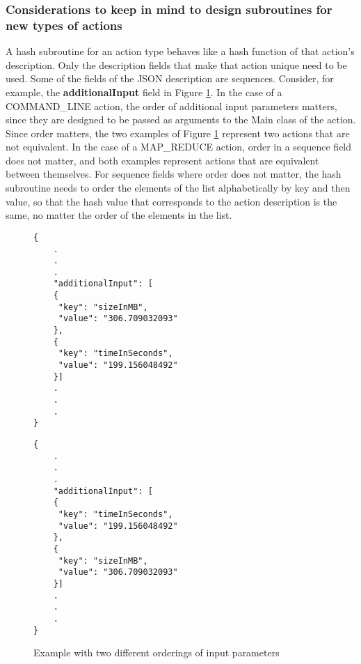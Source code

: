 \subsubsection{Considerations to keep in mind to design subroutines for new types of actions}
A hash subroutine for an action type behaves like a hash function of that action's description.  Only the description fields that make that action unique need to be used.  Some of the fields of the JSON description are sequences.  Consider, for example, the \textbf{additionalInput} field in Figure \ref{fig:action_parameters_ordering}.  In the case of a COMMAND\_LINE action, the order of additional input parameters matters, since they are designed to be passed as arguments to the Main class of the action.  Since order matters, the two examples of Figure \ref{fig:action_parameters_ordering} represent two actions that are not equivalent. In the case of a MAP\_REDUCE action, order in a sequence field does not matter, and both examples represent actions that are equivalent between themselves. For sequence fields where order does not matter, the hash subroutine needs to order the elements of the list alphabetically by key and then value, so that the hash value that corresponds to the action description is the same, no matter the order of the elements in the list.

\begin{figure}[htbp]
\centering
\begin{singlespace}
\begin{minipage}[b]{7 cm}
\begin{mdframed}
\begin{verbatim}
{
    .
    .
    .
    "additionalInput": [
    {
     "key": "sizeInMB",
     "value": "306.709032093"
    }, 
    {
     "key": "timeInSeconds", 
     "value": "199.156048492"
    }]
    .
    .
    .
}
\end{verbatim}
\end{mdframed}
\end{minipage}
\begin{minipage}[b]{7 cm}
\begin{mdframed}
\begin{verbatim}
{
    .
    .
    .
    "additionalInput": [
    {
     "key": "timeInSeconds", 
     "value": "199.156048492"
    },
    {
     "key": "sizeInMB",
     "value": "306.709032093"
    }]
    .
    .
    .
}
\end{verbatim}
\end{mdframed}
\end{minipage}
\end{singlespace}
\caption{Example with two different orderings of input parameters}
\label{fig:action_parameters_ordering}
\end{figure}



